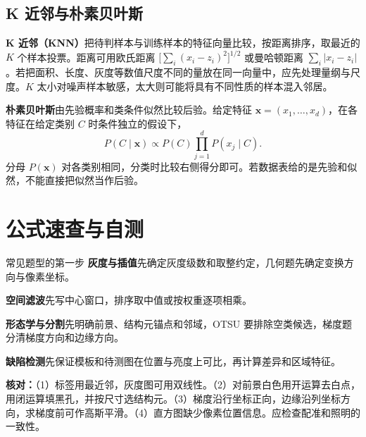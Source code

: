 \subsection{K 近邻与朴素贝叶斯}

\textbf{K 近邻（KNN）}把待判样本与训练样本的特征向量比较，按距离排序，取最近的 $K$ 个样本投票。距离可用欧氏距离 $\bigl[\sum_i(x_i-z_i)^2\bigr]^{1/2}$ 或曼哈顿距离 $\sum_i|x_i-z_i|$。若把面积、长度、灰度等数值尺度不同的量放在同一向量中，应先处理量纲与尺度。$K$ 太小对噪声样本敏感，太大则可能将具有不同性质的样本混入邻居。

\textbf{朴素贝叶斯}由先验概率和类条件似然比较后验。给定特征 $\mathbf x=(x_1,\ldots,x_d)$，在各特征在给定类别 $C$ 时条件独立的假设下，
\[
P(C\mid\mathbf x)\propto P(C)\prod_{j=1}^{d}P(x_j\mid C).
\]
分母 $P(\mathbf x)$ 对各类别相同，分类时比较右侧得分即可。若数据表给的是先验和似然，不能直接把似然当作后验。


\section{公式速查与自测}

\begin{focusbox}{常见题型的第一步}
\textbf{灰度与插值}先确定灰度级数和取整约定，几何题先确定变换方向与像素坐标。\par
\textbf{空间滤波}先写中心窗口，排序取中值或按权重逐项相乘。\par
\textbf{形态学与分割}先明确前景、结构元锚点和邻域，OTSU 要排除空类候选，梯度题分清梯度方向和边缘方向。\par
\textbf{缺陷检测}先保证模板和待测图在位置与亮度上可比，再计算差异和区域特征。
\end{focusbox}

\noindent\textbf{核对：}（1）标签用最近邻，灰度图可用双线性。（2）对前景白色用开运算去白点，用闭运算填黑孔，并按尺寸选结构元。（3）梯度沿行坐标正向，边缘沿列坐标方向，求梯度前可作高斯平滑。（4）直方图缺少像素位置信息。应检查配准和照明的一致性。
